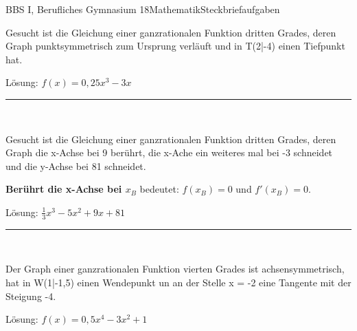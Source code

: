 \documentclass[oneside,openany,headings=optiontotoc,11pt,numbers=noenddot]{scrreprt}
\begin{document}
		\begin{worksheet}{BBS I, Berufliches Gymnasium 18}{Mathematik}{Steckbriefaufgaben}
			\begin{framed}
				\noindent
				Gesucht ist die Gleichung einer ganzrationalen Funktion dritten Grades, deren Graph punktsymmetrisch zum Ursprung verläuft und in T(2|-4) einen Tiefpunkt hat.\\
				\par\noindent
				\footnotesize{Lösung: \(f(x) = 0,25x^3 - 3x\)}\\\normalsize
				\par\noindent
				\rule{\textwidth}{0.1pt}\\
				\par\noindent
				Gesucht ist die Gleichung einer ganzrationalen Funktion dritten Grades, deren Graph die x-Achse bei 9 berührt, die x-Ache ein weiteres mal bei -3 schneidet und die y-Achse bei 81 schneidet.\\
				\par\noindent
				\textbf{Berührt die x-Achse bei \(x_B\)} bedeutet: \(f(x_B) = 0\) und \(f'(x_B) = 0\).\\
				\par\noindent
				\footnotesize{Lösung: \(\frac{1}{3}x^3 - 5x^2 + 9x +81\)}\\\normalsize
				\par\noindent
				\rule{\textwidth}{0.1pt}\\
				\par\noindent
				Der Graph einer ganzrationalen Funktion vierten Grades ist achsensymmetrisch, hat in W(1|-1,5) einen Wendepunkt un an der Stelle x = -2 eine Tangente mit der Steigung -4.\\
				\par\noindent
				\footnotesize{Lösung: \(f(x) = 0,5x^4 - 3x^2 + 1\)}\\
			\end{framed}
		\end{worksheet}
\end{document}
